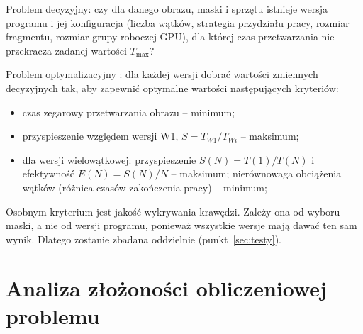 \documentclass[12pt,a4paper]{article}
\begin{document}
Problem decyzyjny: czy dla danego obrazu, maski i sprzętu istnieje wersja programu i jej konfiguracja (liczba wątków, strategia przydziału pracy, rozmiar fragmentu, rozmiar grupy roboczej GPU), dla której czas przetwarzania nie przekracza zadanej wartości $T_{\max}$?

Problem optymalizacyjny \cite{czech}: dla każdej wersji dobrać wartości zmiennych decyzyjnych tak, aby zapewnić optymalne wartości następujących kryteriów:
\begin{itemize}
	\item czas zegarowy przetwarzania obrazu -- minimum;
	\item przyspieszenie względem wersji W1, $S = T_{W1} / T_{Wi}$ -- maksimum;
	\item dla wersji wielowątkowej: przyspieszenie $S(N) = T(1)/T(N)$ i efektywność $E(N) = S(N)/N$ -- maksimum; nierównowaga obciążenia wątków (różnica czasów zakończenia pracy) -- minimum;
\end{itemize}
Osobnym kryterium jest jakość wykrywania krawędzi. Zależy ona od wyboru maski, a nie od wersji programu, ponieważ wszystkie wersje mają dawać ten sam wynik. Dlatego zostanie zbadana oddzielnie (punkt~\ref{sec:testy}).

\section{Analiza złożoności obliczeniowej problemu}
\end{document}
